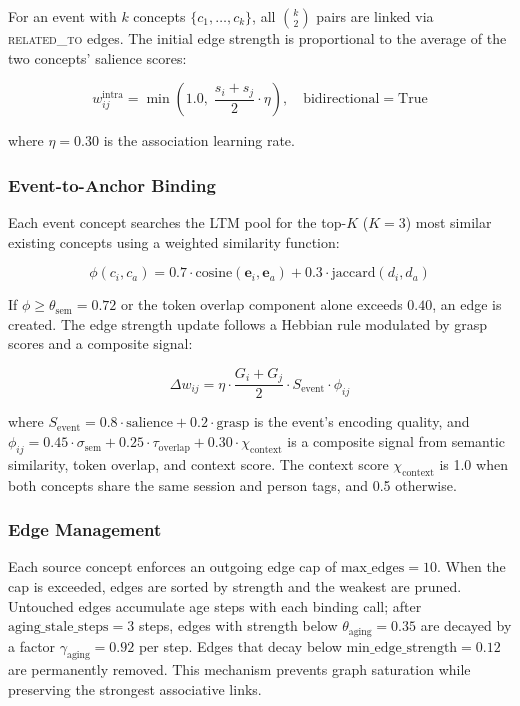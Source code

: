\documentclass[11pt,twocolumn]{article}
\begin{document}
For an event with $k$ concepts $\{c_1, \ldots, c_k\}$, all $\binom{k}{2}$ pairs are linked via \textsc{related\_to} edges. The initial edge strength is proportional to the average of the two concepts' salience scores:

\begin{equation}
w_{ij}^{\text{intra}} = \min\left(1.0,\; \frac{s_i + s_j}{2} \cdot \eta\right), \quad \text{bidirectional} = \text{True}
\label{eq:intra_bind}
\end{equation}

where $\eta = 0.30$ is the association learning rate.

\subsubsection{Event-to-Anchor Binding}

Each event concept searches the LTM pool for the top-$K$ ($K = 3$) most similar existing concepts using a weighted similarity function:

\begin{equation}
\phi(c_i, c_a) = 0.7 \cdot \text{cosine}(\mathbf{e}_i, \mathbf{e}_a) + 0.3 \cdot \text{jaccard}(d_i, d_a)
\label{eq:similarity}
\end{equation}

If $\phi \geq \theta_{\text{sem}} = 0.72$ or the token overlap component alone exceeds $0.40$, an edge is created. The edge strength update follows a Hebbian rule modulated by grasp scores and a composite signal:

\begin{equation}
\Delta w_{ij} = \eta \cdot \frac{G_i + G_j}{2} \cdot S_{\text{event}} \cdot \phi_{ij}
\label{eq:hebbian}
\end{equation}

where $S_{\text{event}} = 0.8 \cdot \text{salience} + 0.2 \cdot \text{grasp}$ is the event's encoding quality, and $\phi_{ij} = 0.45 \cdot \sigma_{\text{sem}} + 0.25 \cdot \tau_{\text{overlap}} + 0.30 \cdot \chi_{\text{context}}$ is a composite signal from semantic similarity, token overlap, and context score. The context score $\chi_{\text{context}}$ is 1.0 when both concepts share the same session and person tags, and 0.5 otherwise.

\subsubsection{Edge Management}

Each source concept enforces an outgoing edge cap of $\text{max\_edges} = 10$. When the cap is exceeded, edges are sorted by strength and the weakest are pruned. Untouched edges accumulate age steps with each binding call; after $\text{aging\_stale\_steps} = 3$ steps, edges with strength below $\theta_{\text{aging}} = 0.35$ are decayed by a factor $\gamma_{\text{aging}} = 0.92$ per step. Edges that decay below $\text{min\_edge\_strength} = 0.12$ are permanently removed. This mechanism prevents graph saturation while preserving the strongest associative links.
\end{document}

